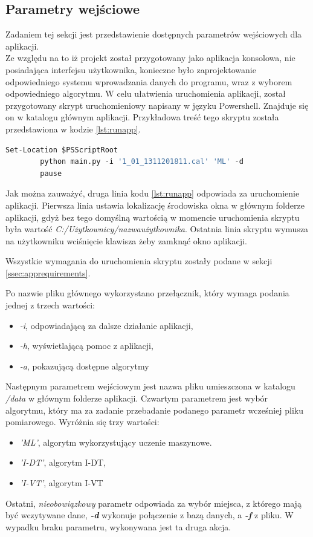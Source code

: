 \subsection{Parametry wejściowe}
\label{ssec:parameters}
Zadaniem tej sekcji jest przedstawienie dostępnych parametrów wejściowych dla aplikacji.\\
Ze względu na to iż projekt został przygotowany jako aplikacja konsolowa, nie posiadająca interfejsu użytkownika, konieczne było zaprojektowanie odpowiedniego systemu wprowadzania danych do programu, wraz z wyborem odpowiedniego algorytmu. W celu ułatwienia uruchomienia aplikacji, został przygotowany skrypt uruchomieniowy napisany w języku Powershell. Znajduje się on w katalogu głównym aplikacji. Przykładowa treść tego skryptu została przedstawiona w kodzie \ref{lst:runapp}.\par
\begin{lstlisting}[language=Python, caption=Skrypt uruchomieniowy aplikacji, label={lst:runapp}]
        Set-Location $PSScriptRoot
        python main.py -i '1_01_1311201811.cal' 'ML' -d
        pause
\end{lstlisting}
Jak można zauważyć, druga linia kodu \ref{lst:runapp} odpowiada za uruchomienie aplikacji. Pierwsza linia ustawia lokalizację środowiska okna w głównym folderze aplikacji, gdyż bez tego domyślną wartością w momencie uruchomienia skryptu była wartość \emph{C:/Użytkownicy/nazwaużytkownika}. Ostatnia linia skryptu wymusza na użytkowniku wciśnięcie klawisza żeby zamknąć okno aplikacji.\par
Wszystkie wymagania do uruchomienia skryptu zostały podane w sekcji \ref{ssec:apprequirements}.\par
Po nazwie pliku głównego wykorzystano przełącznik, który wymaga podania jednej z trzech wartości:
\begin{itemize}
        \item \emph{-i}, odpowiadającą za dalsze działanie aplikacji,
        \item \emph{-h}, wyświetlającą pomoc z aplikacji,
        \item \emph{-a}, pokazującą dostępne algorytmy
\end{itemize}
Następnym parametrem wejściowym jest nazwa pliku umieszczona w katalogu \emph{/data} w głównym folderze aplikacji. Czwartym parametrem jest wybór algorytmu, który ma za zadanie przebadanie podanego parametr wcześniej pliku pomiarowego. Wyróżnia się trzy wartości:
\begin{itemize}
        \item \emph{'ML'}, algorytm wykorzystujący uczenie maszynowe.
        \item \emph{'I-DT'}, algorytm I-DT,
        \item \emph{'I-VT'}, algorytm I-VT
\end{itemize}
Ostatni, \emph{nieobowiązkowy} parametr odpowiada za wybór miejsca, z którego mają być wczytywane dane, \emph{\textbf{-d}} wykonuje połączenie z bazą danych, a \emph{\textbf{-f}} z pliku. W wypadku braku parametru, wykonywana jest ta druga akcja.
